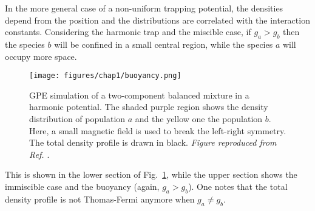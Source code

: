 In the more general case of a non-uniform trapping potential, the densities depend from the position and the distributions are correlated with the interaction constants. Considering the harmonic trap and the miscible case, if $g_a > g_b$ then the species $b$ will be confined in a small central region, while the species $a$ will occupy more space.
\begin{figure}[ht!]
    \centering
    \texttt{[image: figures/chap1/buoyancy.png]}
    \caption{GPE simulation of a two-component balanced mixture in a harmonic potential. The shaded purple region shows the density distribution of population $a$ and the yellow one the population $b$. Here, a small magnetic field is used to break the left-right symmetry. The total density profile is drawn in black. \emph{Figure reproduced from Ref. \cite{lamporesi2023two}}.} 
    \label{fig:buoy}
\end{figure}
This is shown in the lower section of Fig.\ \ref{fig:buoy}, while the upper section shows the immiscible case and the buoyancy (again, $g_a > g_b$). One notes that the total density profile is not Thomas-Fermi anymore when $g_a \neq g_b$.


